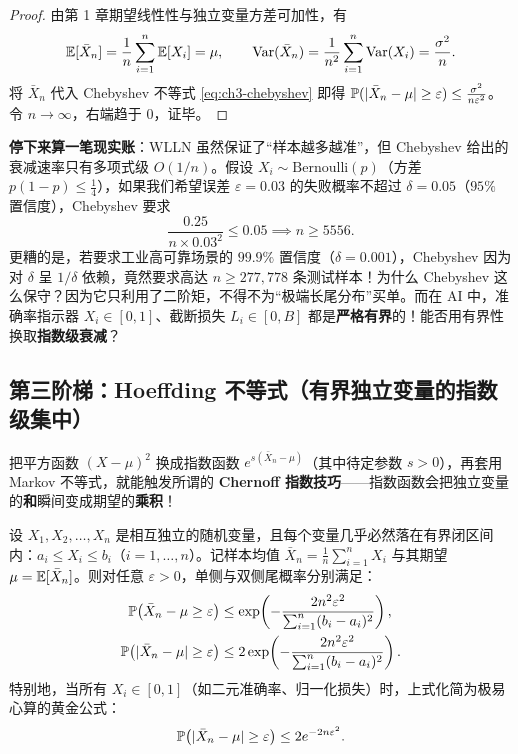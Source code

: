 \begin{proof}
由第 1 章期望线性性与独立变量方差可加性，有
\[
  \mathbb{E}[\bar{X}_n] = \frac{1}{n}\sum_{i=1}^n \mathbb{E}[X_i] = \mu,
  \qquad
  \operatorname{Var}(\bar{X}_n) = \frac{1}{n^2}\sum_{i=1}^n \operatorname{Var}(X_i) = \frac{\sigma^2}{n}.
\]
将 $\bar{X}_n$ 代入 Chebyshev 不等式 \eqref{eq:ch3-chebyshev} 即得 $\mathbb{P}(|\bar{X}_n - \mu| \ge \varepsilon) \le \frac{\sigma^2}{n\varepsilon^2}$。令 $n \to \infty$，右端趋于 $0$，证毕。
\end{proof}

\textbf{停下来算一笔现实账}：WLLN 虽然保证了“样本越多越准”，但 Chebyshev 给出的衰减速率只有多项式级 $O(1/n)$。假设 $X_i \sim \mathrm{Bernoulli}(p)$（方差 $p(1-p) \le \tfrac{1}{4}$），如果我们希望误差 $\varepsilon = 0.03$ 的失败概率不超过 $\delta = 0.05$（$95\%$ 置信度），Chebyshev 要求
\[
  \frac{0.25}{n \times 0.03^2} \le 0.05 \implies n \ge 5556.
\]
更糟的是，若要求工业高可靠场景的 $99.9\%$ 置信度（$\delta = 0.001$），Chebyshev 因为对 $\delta$ 呈 $1/\delta$ 依赖，竟然要求高达 $n \ge 277{,}778$ 条测试样本！为什么 Chebyshev 这么保守？因为它只利用了二阶矩，不得不为“极端长尾分布”买单。而在 AI 中，准确率指示器 $X_i \in [0, 1]$、截断损失 $L_i \in [0, B]$ 都是\textbf{严格有界}的！能否用有界性换取\textbf{指数级衰减}？

\subsection{第三阶梯：Hoeffding 不等式（有界独立变量的指数级集中）}

把平方函数 $(X-\mu)^2$ 换成指数函数 $e^{s(\bar{X}_n - \mu)}$（其中待定参数 $s > 0$），再套用 Markov 不等式，就能触发所谓的 \textbf{Chernoff 指数技巧}——指数函数会把独立变量的\textbf{和}瞬间变成期望的\textbf{乘积}！

\begin{thmBox}
\begin{theorem}
\label{thm:ch3-hoeffding}
设 $X_1, X_2, \dots, X_n$ 是相互独立的随机变量，且每个变量几乎必然落在有界闭区间内：$a_i \le X_i \le b_i$（$i=1,\dots,n$）。记样本均值 $\bar{X}_n = \frac{1}{n}\sum_{i=1}^n X_i$ 与其期望 $\mu = \mathbb{E}[\bar{X}_n]$。则对任意 $\varepsilon > 0$，单侧与双侧尾概率分别满足：
\begin{align}
  \mathbb{P}\bigl(\bar{X}_n - \mu \ge \varepsilon\bigr) &\le \exp\!\left(-\frac{2 n^2 \varepsilon^2}{\sum_{i=1}^n (b_i - a_i)^2}\right), \label{eq:ch3-hoeffding-1}\\
  \mathbb{P}\bigl(|\bar{X}_n - \mu| \ge \varepsilon\bigr) &\le 2\exp\!\left(-\frac{2 n^2 \varepsilon^2}{\sum_{i=1}^n (b_i - a_i)^2}\right). \label{eq:ch3-hoeffding-2}
\end{align}
特别地，当所有 $X_i \in [0, 1]$（如二元准确率、归一化损失）时，上式化简为极易心算的黄金公式：
\begin{equation}
  \mathbb{P}\bigl(|\bar{X}_n - \mu| \ge \varepsilon\bigr) \le 2 e^{-2 n \varepsilon^2}. \label{eq:ch3-hoeffding-01}
\end{equation}
\end{theorem}
\end{thmBox}

